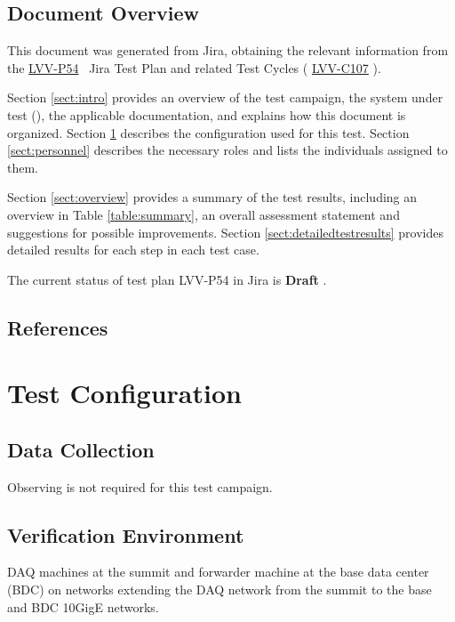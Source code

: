 \documentclass[DM,lsstdraft,STR,toc]{lsstdoc}
\begin{document}
\subsection{Document Overview}
\label{sect:docoverview}

This document was generated from Jira, obtaining the relevant information from the 
\href{https://jira.lsstcorp.org/secure/Tests.jspa#/testPlan/LVV-P54}{LVV-P54}
~Jira Test Plan and related Test Cycles (
  \href{https://jira.lsstcorp.org/secure/Tests.jspa#/testCycle/LVV-C107}{LVV-C107}
).

Section \ref{sect:intro} provides an overview of the test campaign, the system under test (\product{}), the applicable documentation, and explains how this document is organized.
Section \ref{sect:configuration}  describes the configuration used for this test.
Section \ref{sect:personnel} describes the necessary roles and lists the individuals assigned to them.

Section \ref{sect:overview} provides a summary of the test results, including an overview in Table \ref{table:summary}, an overall assessment statement and suggestions for possible improvements.
Section \ref{sect:detailedtestresults} provides detailed results for each step in each test case.

The current status of test plan LVV-P54 in Jira is \textbf{ Draft }.

\subsection{References}
\label{sect:references}
\renewcommand{\refname}{}

\section{Test Configuration}
\label{sect:configuration}

\subsection{Data Collection}

  Observing is not required for this test campaign.

\subsection{Verification Environment}
\label{sect:hwconf}
  DAQ machines at the summit and forwarder machine at the base data center
(BDC) on networks extending the DAQ network from the summit to the base
and BDC 10GigE networks. ~
\end{document}
